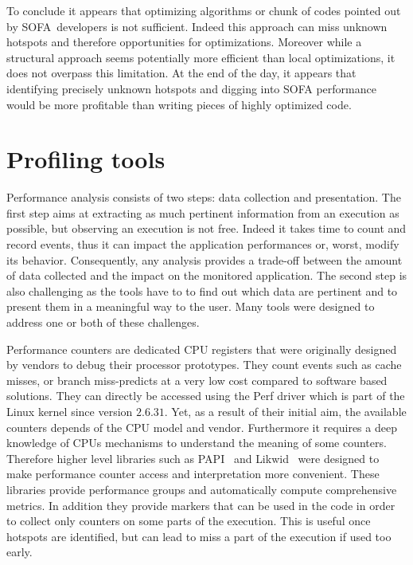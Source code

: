 To conclude it appears that optimizing algorithms or chunk of codes pointed out by \gls{SOFA} developers is not sufficient.
Indeed this approach can miss unknown hotspots and therefore opportunities for optimizations.
Moreover while a structural approach seems potentially more efficient than local optimizations, it does not overpass this limitation.
At the end of the day, it appears that identifying precisely unknown hotspots and digging into \gls{SOFA} performance would be more profitable than writing pieces of highly optimized code.

\section{Profiling tools}
\label{sec:prof-tools}

Performance analysis consists of two steps: data collection and presentation.
The first step aims at extracting as much pertinent information from an execution as possible, but observing an execution is not free.
Indeed it takes time to count and record events, thus it can impact the application performances or, worst, modify its behavior.
Consequently, any analysis provides a trade-off between the amount of data collected and the impact on the monitored application.
The second step is also challenging as the tools have to to find out which data are pertinent and to present them in a meaningful way to the user.
Many tools were designed to address one or both of these challenges.

Performance counters are dedicated \gls{CPU} registers that were originally designed by vendors to debug their processor prototypes.
They count events such as cache misses, or branch miss-predicts at a very low cost compared to software based solutions.
They can directly be accessed using the \gls{Perf} driver which is part of the \gls{Linux} kernel since version $2.6.31$.
Yet, as a result of their initial aim, the available counters depends of the \gls{CPU} model and vendor.
Furthermore it requires a deep knowledge of \glspl{CPU} mechanisms to understand the meaning of some counters.
Therefore higher level libraries such as \gls{PAPI}~\cite{Browne00Portable,Malony11Parallel,Weaver13PAPI} and \gls{Likwid}~\cite{Treibig10LIKWID} were designed to make performance counter access and interpretation more convenient.
These libraries provide performance groups and automatically compute comprehensive metrics.
In addition they provide markers that can be used in the code in order to collect only counters on some parts of the execution.
This is useful once hotspots are identified, but can lead to miss a part of the execution if used too early.

